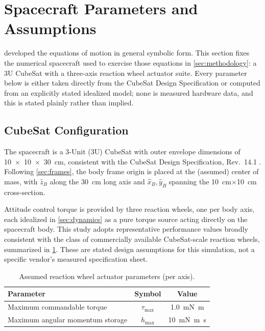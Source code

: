 \section{Spacecraft Parameters and Assumptions}
\label{sec:parameters}

 developed the equations of motion in general symbolic form. This section fixes the numerical spacecraft used to exercise those equations in \cref{sec:methodology}: a 3U CubeSat with a three-axis reaction wheel actuator suite. Every parameter below is either taken directly from the CubeSat Design Specification or computed from an explicitly stated idealized model; none is measured hardware data, and this is stated plainly rather than implied.

\subsection{CubeSat Configuration}
\label{sec:configuration}

The spacecraft is a 3-Unit (3U) CubeSat with outer envelope dimensions of \SI{10x10x30}{\centi\meter}, consistent with the CubeSat Design Specification, Rev.~14.1 \cite{cubesatspec2022}. Following \cref{sec:frames}, the body frame origin is placed at the (assumed) center of mass, with $\hat z_B$ along the \SI{30}{\centi\meter} long axis and $\hat x_B,\hat y_B$ spanning the \SI{10}{\centi\meter}$\times$\SI{10}{\centi\meter} cross-section.

Attitude control torque is provided by three reaction wheels, one per body axis, each idealized in \cref{sec:dynamics} as a pure torque source acting directly on the spacecraft body. This study adopts representative performance values broadly consistent with the class of commercially available CubeSat-scale reaction wheels, summarized in \cref{tab:wheel_params}. These are stated design assumptions for this simulation, not a specific vendor's measured specification sheet.

\begin{table}[htbp]
\centering
\caption{Assumed reaction wheel actuator parameters (per axis).}
\label{tab:wheel_params}
\begin{tabular}{@{}lcc@{}}
\toprule
Parameter & Symbol & Value \\
\midrule
Maximum commandable torque & $\tau_{\max}$ & \SI{1.0}{\milli\newton\meter} \\
Maximum angular momentum storage & $h_{\max}$ & \SI{10}{\milli\newton\meter\second} \\
\bottomrule
\end{tabular}
\end{table}

